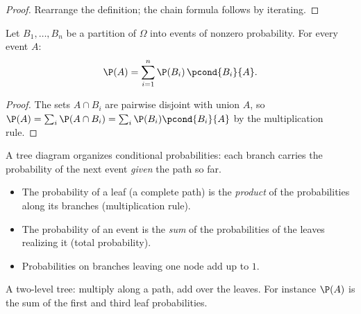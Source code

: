 \begin{proof}
Rearrange the definition; the chain formula follows by iterating.
\end{proof}

\begin{theorem}\label{thm:tle:condprob:total}
Let $B_1, \dots, B_n$ be a partition of $\Omega$ into events of nonzero
probability. For every event $A$:
\[
\P(A) = \sum_{i=1}^{n} \P(B_i)\,\pcond{B_i}{A}.
\]
\end{theorem}

\begin{proof}
The sets $A \cap B_i$ are pairwise disjoint with union $A$, so
$\P(A) = \sum_i \P(A \cap B_i) = \sum_i \P(B_i)\pcond{B_i}{A}$ by the
multiplication rule.
\end{proof}

\begin{method}\label{met:tle:condprob:tree}
A tree diagram organizes conditional probabilities: each branch carries the
probability of the next event \emph{given} the path so far.
\begin{itemize}
  \item The probability of a leaf (a complete path) is the \emph{product} of
        the probabilities along its branches (multiplication rule).
  \item The probability of an event is the \emph{sum} of the probabilities
        of the leaves realizing it (total probability).
  \item Probabilities on branches leaving one node add up to $1$.
\end{itemize}
\end{method}

\begin{omfigure}

{\small A two-level tree: multiply along a path, add over the leaves.
For instance $\P(A)$ is the sum of the first and third leaf
probabilities.}
\end{omfigure}

